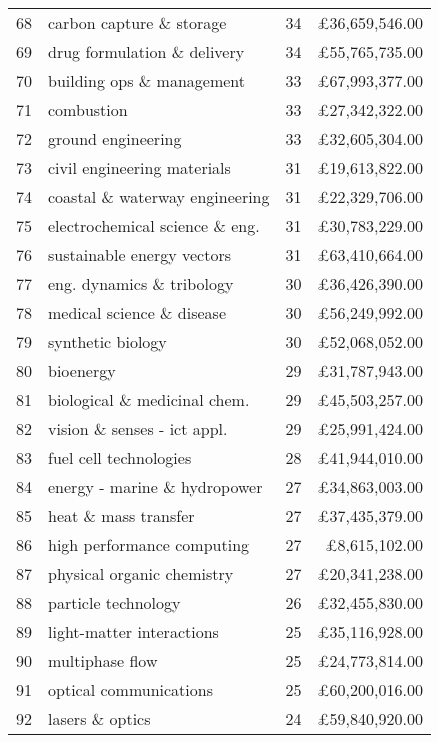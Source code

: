 \begin{spacing}{0.9}
\begin{longtable}[c]{r|>{\raggedleft\arraybackslash}m{6.5cm}|>{\raggedleft\arraybackslash}m{1.9cm}|r}
{68} & {carbon capture \& storage} & {34} & {\pounds36,659,546.00}\\
{69} & {drug formulation \& delivery} & {34} & {\pounds55,765,735.00}\\
{70} & {building ops \& management} & {33} & {\pounds67,993,377.00}\\
{71} & {combustion} & {33} & {\pounds27,342,322.00}\\
{72} & {ground engineering} & {33} & {\pounds32,605,304.00}\\
{73} & {civil engineering materials} & {31} & {\pounds19,613,822.00}\\
{74} & {coastal \& waterway engineering} & {31} & {\pounds22,329,706.00}\\
{75} & {electrochemical science \& eng.} & {31} & {\pounds30,783,229.00}\\
{76} & {sustainable energy vectors} & {31} & {\pounds63,410,664.00}\\
{77} & {eng. dynamics \& tribology} & {30} & {\pounds36,426,390.00}\\
{78} & {medical science \& disease} & {30} & {\pounds56,249,992.00}\\
{79} & {synthetic biology} & {30} & {\pounds52,068,052.00}\\
{80} & {bioenergy} & {29} & {\pounds31,787,943.00}\\
{81} & {biological \& medicinal chem.} & {29} & {\pounds45,503,257.00}\\
{82} & {vision \& senses - ict appl.} & {29} & {\pounds25,991,424.00}\\
{83} & {fuel cell technologies} & {28} & {\pounds41,944,010.00}\\
{84} & {energy - marine \& hydropower} & {27} & {\pounds34,863,003.00}\\
{85} & {heat \& mass transfer} & {27} & {\pounds37,435,379.00}\\
{86} & {high performance computing} & {27} & {\pounds8,615,102.00}\\
{87} & {physical organic chemistry} & {27} & {\pounds20,341,238.00}\\
{88} & {particle technology} & {26} & {\pounds32,455,830.00}\\
{89} & {light-matter interactions} & {25} & {\pounds35,116,928.00}\\
{90} & {multiphase flow} & {25} & {\pounds24,773,814.00}\\
{91} & {optical communications} & {25} & {\pounds60,200,016.00}\\
{92} & {lasers \& optics} & {24} & {\pounds59,840,920.00}\\

\end{longtable}
\end{spacing}
